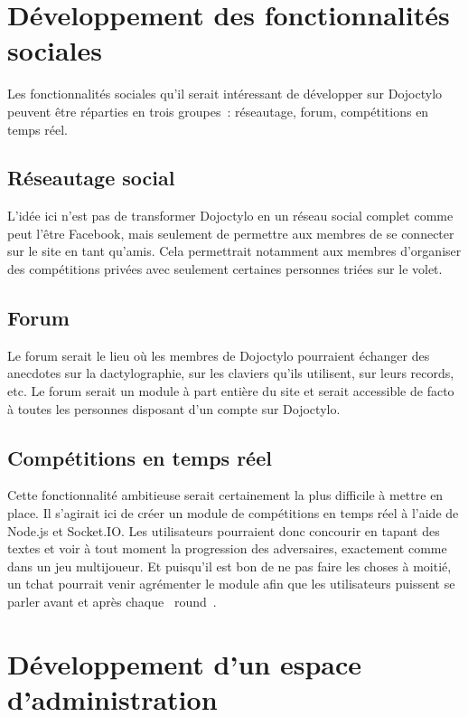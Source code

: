 \documentclass[a4paper,12pt]{article}
\begin{document}
\section{Développement des fonctionnalités sociales}

Les fonctionnalités sociales qu'il serait intéressant de développer sur Dojoctylo peuvent être réparties en trois groupes~: réseautage, forum, compétitions en temps réel.

\subsection{Réseautage social}

L'idée ici n'est pas de transformer Dojoctylo en un réseau social complet comme peut l'être Facebook, mais seulement de permettre aux membres de se connecter sur le site en tant qu'amis. Cela permettrait notamment aux membres d'organiser des compétitions privées avec seulement certaines personnes triées sur le volet.

\subsection{Forum}

Le forum serait le lieu où les membres de Dojoctylo pourraient échanger des anecdotes sur la dactylographie, sur les claviers qu'ils utilisent, sur leurs records, etc. Le forum serait un module à part entière du site et serait accessible de facto à toutes les personnes disposant d'un compte sur Dojoctylo.

\subsection{Compétitions en temps réel}

Cette fonctionnalité ambitieuse serait certainement la plus difficile à mettre en place. Il s'agirait ici de créer un module de compétitions en temps réel à l'aide de Node.js et Socket.IO. Les utilisateurs pourraient donc concourir en tapant des textes et voir à tout moment la progression des adversaires, exactement comme dans un jeu multijoueur. Et puisqu'il est bon de ne pas faire les choses à moitié, un tchat pourrait venir agrémenter le module afin que les utilisateurs puissent se parler avant et après chaque \og~round~\fg.

\section{Développement d'un espace d'administration}
\end{document}
